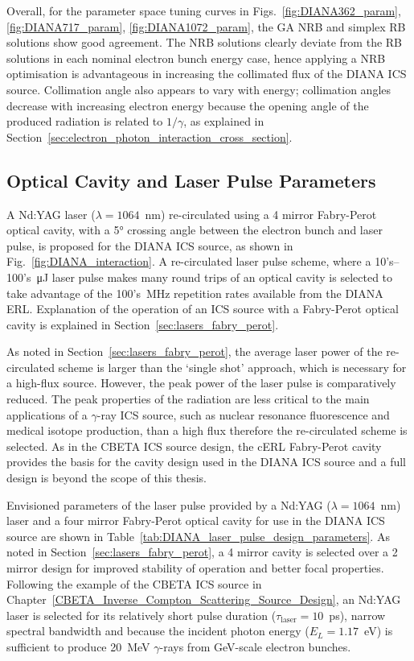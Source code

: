 \documentclass[../main.tex]{subfiles}
\begin{document}
Overall, for the parameter space tuning curves in Figs.~\ref{fig:DIANA362_param}, \ref{fig:DIANA717_param}, \ref{fig:DIANA1072_param}, the GA NRB and simplex RB solutions show good agreement. The NRB solutions clearly deviate from the RB solutions in each nominal electron bunch energy case, hence applying a NRB optimisation is advantageous in increasing the collimated flux of the DIANA ICS source. Collimation angle also appears to vary with energy; collimation angles decrease with increasing electron energy because the opening angle of the produced radiation is related to $1/\gamma$, as explained in Section~\ref{sec:electron_photon_interaction_cross_section}.  

\subsection{Optical Cavity and Laser Pulse Parameters}
\label{sec:DIANA_laser_fabry_perot}

A Nd:YAG laser ($\lambda = 1064$~\si{\nano\meter}) re-circulated using a 4 mirror Fabry-Perot optical cavity, with a 5\si{\degree} crossing angle between the electron bunch and laser pulse, is proposed for the DIANA ICS source, as shown in Fig.~\ref{fig:DIANA_interaction}. A re-circulated laser pulse scheme, where a 10's--100's~\si{\micro\joule} laser pulse makes many round trips of an optical cavity is selected to take advantage of the 100's~\si{\mega\hertz} repetition rates available from the DIANA ERL. Explanation of the operation of an ICS source with a Fabry-Perot optical cavity is explained in Section~\ref{sec:lasers_fabry_perot}.

As noted in Section~\ref{sec:lasers_fabry_perot}, the average laser power of the re-circulated scheme is larger than the `single shot' approach, which is necessary for a high-flux source. However, the peak power of the laser pulse is comparatively reduced. The peak properties of the radiation are less critical to the main applications of a $\gamma$-ray ICS source, such as nuclear resonance fluorescence and medical isotope production, than a high flux therefore the re-circulated scheme is selected. As in the CBETA ICS source design, the cERL Fabry-Perot cavity \cite{akagi2016narrow} provides the basis for the cavity design used in the DIANA ICS source and a full design is beyond the scope of this thesis.

Envisioned parameters of the laser pulse provided by a Nd:YAG ($\lambda = 1064$~\si{\nano\meter}) laser and a four mirror Fabry-Perot optical cavity for use in the DIANA ICS source are shown in Table~\ref{tab:DIANA_laser_pulse_design_parameters}. As noted in Section~\ref{sec:lasers_fabry_perot}, a 4 mirror cavity is selected over a 2 mirror design for improved stability of operation and better focal properties. Following the example of the CBETA ICS source in Chapter~\ref{CBETA_Inverse_Compton_Scattering_Source_Design}, an Nd:YAG laser is selected for its relatively short pulse duration ($\tau_{\mathrm{laser}}=10$~\si{\pico\second}), narrow spectral bandwidth and because the incident photon energy ($E_{L}=1.17$~\si{\electronvolt}) is sufficient to produce 20~\si{\mega\electronvolt} $\gamma$-rays from \si{\giga\electronvolt}-scale electron bunches. 
\end{document}
